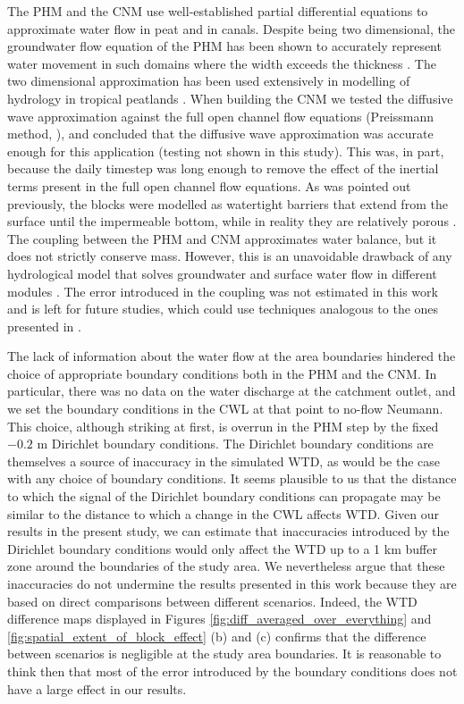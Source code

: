 \documentclass[bg, manuscript]{copernicus}
\begin{document}
The PHM and the CNM use well-established partial differential equations to approximate water flow in peat and in canals.
Despite being two dimensional, the groundwater flow equation of the PHM has been shown to accurately represent water movement in such domains where the width exceeds the thickness \citep{connortonDoesRegionalGroundwaterflow1985}.
The two dimensional approximation has been used extensively in modelling of hydrology in tropical peatlands \citep{bairdDigiBogPeatlandDevelopment2012, cobbHowTemporalPatterns2017}.
When building the CNM we tested the diffusive wave approximation against the full open channel flow equations (Preissmann method, \cite{cungePracticalAspectsComputational1980, haahtiUnsteadyFlowSimulation2014}), and concluded that the diffusive wave approximation was accurate enough for this application (testing not shown in this study). 
This was, in part, because the daily timestep was long enough to remove the effect of the inertial terms present in the full open channel flow equations.
As was pointed out previously, the blocks were modelled as watertight barriers that extend from the surface until the impermeable bottom, while in reality they are relatively porous \citep{osakiTropicalPeatlandEcosystems2016, ritzemaCanalBlockingStrategies2014}.
The coupling between the PHM and CNM approximates water balance, but it does not strictly conserve mass.
However, this is an unavoidable drawback of any hydrological model that solves groundwater and surface water flow in different modules \citep{barthelGroundwaterSurfaceWater2016}. 
The error introduced in the coupling was not estimated in this work and is left for future studies, which could use techniques analogous to the ones presented in \cite{gasda2011}.

The lack of information about the water flow at the area boundaries hindered the choice of appropriate boundary conditions both in the PHM and the CNM.
In particular, there was no data on the water discharge at the catchment outlet, and we set the boundary conditions in the CWL at that point to no-flow Neumann.
This choice, although striking at first, is overrun in the PHM step by the fixed $-0.2$ \unit{m} Dirichlet boundary conditions.
The   Dirichlet boundary conditions are themselves a source of inaccuracy in the simulated WTD, as would be the case with any choice of boundary conditions.
It seems plausible to us that the  distance to which the signal of the Dirichlet boundary conditions can propagate may be similar to the distance to which a change in the CWL affects WTD.
Given our results in the present study, we can estimate that inaccuracies introduced by the Dirichlet boundary conditions would only affect the WTD up to a 1 km buffer zone around the boundaries of the study area.
We nevertheless argue that these inaccuracies do not undermine the results presented in this work because they are based on direct comparisons between different scenarios.
Indeed, the WTD difference maps displayed in Figures \ref{fig:diff_averaged_over_everything} and \ref{fig:spatial_extent_of_block_effect} (b) and (c) confirms that the difference between scenarios is negligible at the study area boundaries.
It is reasonable to think then that most of the error introduced by the boundary conditions does not have a large effect in our results.
\end{document}

